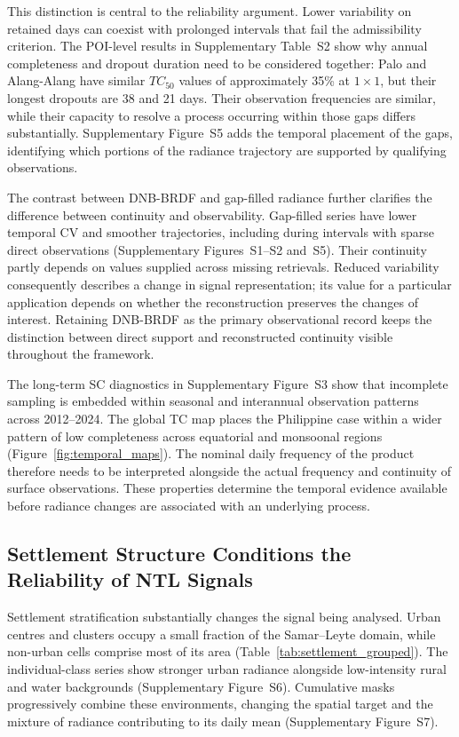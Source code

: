 \documentclass[]{interact}
\theoremstyle{plain}%
\theoremstyle{definition}
\theoremstyle{remark}
\begin{document}
        This distinction is central to the reliability argument. Lower variability on retained days can coexist with prolonged intervals that fail the admissibility criterion. The POI-level results in Supplementary Table~S2 show why annual completeness and dropout duration need to be considered together: Palo and Alang-Alang have similar $TC_{50}$ values of approximately 35\% at $1\times1$, but their longest dropouts are 38 and 21 days. Their observation frequencies are similar, while their capacity to resolve a process occurring within those gaps differs substantially. Supplementary Figure~S5 adds the temporal placement of the gaps, identifying which portions of the radiance trajectory are supported by qualifying observations.
        
        The contrast between DNB-BRDF and gap-filled radiance further clarifies the difference between continuity and observability. Gap-filled series have lower temporal CV and smoother trajectories, including during intervals with sparse direct observations (Supplementary Figures~S1--S2 and~S5). Their continuity partly depends on values supplied across missing retrievals. Reduced variability consequently describes a change in signal representation; its value for a particular application depends on whether the reconstruction preserves the changes of interest. Retaining DNB-BRDF as the primary observational record keeps the distinction between direct support and reconstructed continuity visible throughout the framework.
        
        The long-term SC diagnostics in Supplementary Figure~S3 show that incomplete sampling is embedded within seasonal and interannual observation patterns across 2012--2024. The global TC map places the Philippine case within a wider pattern of low completeness across equatorial and monsoonal regions (Figure~\ref{fig:temporal_maps}). The nominal daily frequency of the product therefore needs to be interpreted alongside the actual frequency and continuity of surface observations. These properties determine the temporal evidence available before radiance changes are associated with an underlying process.
    
    \subsection{Settlement Structure Conditions the Reliability of NTL Signals}
    
        Settlement stratification substantially changes the signal being analysed. Urban centres and clusters occupy a small fraction of the Samar--Leyte domain, while non-urban cells comprise most of its area (Table~\ref{tab:settlement_grouped}). The individual-class series show stronger urban radiance alongside low-intensity rural and water backgrounds (Supplementary Figure~S6). Cumulative masks progressively combine these environments, changing the spatial target and the mixture of radiance contributing to its daily mean (Supplementary Figure~S7).
        
\end{document}
